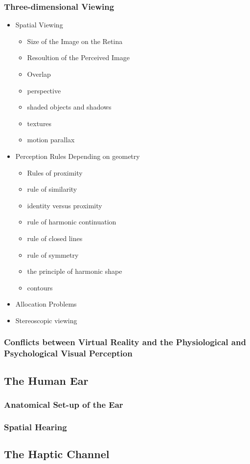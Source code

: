 \documentclass{standalone}
\begin{document}
\subsubsection{Three-dimensional Viewing}
\begin{itemize}
\item Spatial Viewing
	\begin{itemize}
		\item Size of the Image on the Retina
		\item Resoultion of the Perceived Image
		\item Overlap
		\item perspective
		\item shaded objects and shadows
		\item textures
		\item motion parallax
\end{itemize}
\item Perception Rules Depending on geometry
	\begin{itemize}
		\item Rules of proximity
		\item rule of similarity
		\item identity versus proximity
		\item rule of harmonic continuation
		\item rule of closed lines
		\item rule of symmetry
		\item the principle of harmonic shape
		\item contours
	\end{itemize}
\item Allocation Problems
\item Stereoscopic viewing
\end{itemize}
\subsubsection{Conflicts between Virtual Reality and the Physiological and Psychological Visual Perception}
\subsection{The Human Ear}
\subsubsection{Anatomical Set-up of the Ear}
\subsubsection{Spatial Hearing}
\subsection{The Haptic Channel}
\end{document}
